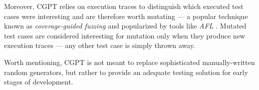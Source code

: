 \documentclass[sigconf, anonymous, review]{acmart}
\begin{document}
%
Moreover, CGPT relies on execution traces to distinguish which executed test
cases were interesting and are therefore worth mutating --- a popular technique
known as \emph{coverage-guided fuzzing} and popularized by tools like \emph{AFL}
\cite{afl}.
%
Mutated test cases are considered interesting for mutation only when they
produce new execution traces --- any other test case is simply thrown away.


Worth mentioning, CGPT is not meant to replace sophisticated manually-written
random generators, but rather to provide an adequate testing solution for early
stages of development.
\end{document}
